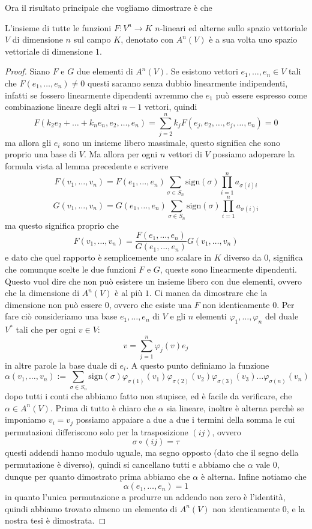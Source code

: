\documentclass[11pt]{scrartcl}
\begin{document}
   	 Ora il risultato principale che vogliamo dimostrare è che 
   	 \begin{theorem}
   	 	L'insieme di tutte le funzioni $F:V^n\to K$ $n$-lineari ed alterne sullo spazio vettoriale $V$ di dimensione $n$ sul campo $K$, denotato con $A^n(V)$ è a sua volta uno spazio vettoriale di dimensione $1$.
   	 \end{theorem}
   	 \begin{proof}
   	 	Siano $F$ e $G$ due elementi di $A^n(V)$. Se esistono vettori $e_1,\dots,e_n\in V$ tali che $F(e_1,\dots,e_n)\ne 0$ questi saranno senza dubbio linearmente indipendenti, infatti se fossero linearmente dipendenti avremmo che $e_1$ può essere espresso come combinazione lineare degli altri $n-1$ vettori, quindi
   	 	$$F(k_2e_2+\dots+k_ne_n,e_2,\dots,e_n)=\sum_{j=2}^n k_jF(e_j,e_2,\dots,e_j,\dots,e_n)=0$$ 
   	 	ma allora gli $e_i$ sono un insieme libero massimale, questo significa che sono proprio una base di $V$. Ma allora per ogni $n$ vettori di $V$ possiamo adoperare la formula vista al lemma precedente e scrivere
   	 	$$F(v_1,\dots,v_n)=F(e_1,\dots,e_n)\sum_{\sigma\in S_n}\text{sign}(\sigma)\prod_{i=1}^{n}a_{\sigma(i)i}$$
   	 	$$G(v_1,\dots,v_n)=G(e_1,\dots,e_n)\sum_{\sigma\in S_n}\text{sign}(\sigma)\prod_{i=1}^{n}a_{\sigma(i)i}$$
   	 	ma questo significa proprio che 
   	 	$$F(v_1,\dots,v_n)=\frac{F(e_1,\dots,e_n)}{G(e_1,\dots,e_n)}G(v_1,\dots,v_n)$$
   	 	e dato che quel rapporto è semplicemente uno scalare in $K$ diverso da $0$, significa che comunque scelte le due funzioni $F$ e $G$, queste sono linearmente dipendenti. Questo vuol dire che non può esistere un insieme libero con due elementi, ovvero che la dimensione di $A^n(V)$ è al più $1$. Ci manca da dimostrare che la dimensione non può essere $0$, ovvero che esiste una $F$ non identicamente $0$. Per fare ciò consideriamo una base $e_1,\dots,e_n$ di $V$ e gli $n$ elementi $\varphi_1,\dots,\varphi_n$ del duale $V^*$ tali che per ogni $v\in V$: 
   	 	$$v=\sum_{j=1}^n \varphi_j(v) e_j$$
   	 	in altre parole la base duale di $e_i$. A questo punto definiamo la funzione
   	 	$$\alpha(v_1,\dots,v_n):=\sum_{\sigma\in S_n}\text{sign}(\sigma)\varphi_{\sigma(1)}(v_1)\varphi_{\sigma(2)}(v_2)\varphi_{\sigma(3)}(v_3)\dots \varphi_{\sigma(n)}(v_n)$$
   	 	dopo tutti i conti che abbiamo fatto non stupisce, ed è facile da verificare, che $\alpha\in A^n(V)$. Prima di tutto è chiaro che $\alpha$ sia lineare, inoltre è alterna perchè se imponiamo $v_i=v_j$ possiamo appaiare a due a due i termini della somma le cui permutazioni differiscono solo per la trasposizione $(ij)$, ovvero
   	 	$$\sigma\circ(ij)=\tau$$
   	 	questi addendi hanno modulo uguale, ma segno opposto (dato che il segno della permutazione è diverso), quindi si cancellano tutti e abbiamo che $\alpha$ vale $0$, dunque per quanto dimostrato prima abbiamo che $\alpha$ è alterna. Infine notiamo che 
   	 	$$\alpha(e_1,\dots,e_n)=1$$
   	 	in quanto l'unica permutazione a produrre un addendo non zero è l'identità, quindi abbiamo trovato almeno un elemento di $A^n(V)$ non identicamente $0$, e la nostra tesi è dimostrata.
   	 \end{proof}
\end{document}
